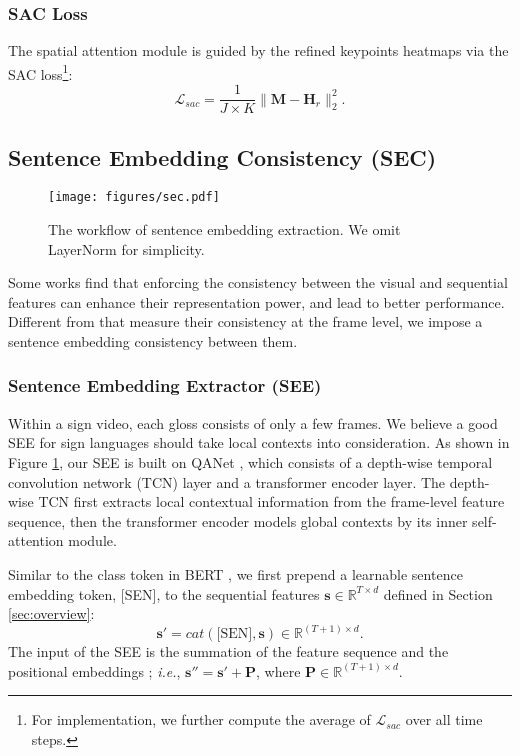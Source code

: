 \documentclass[acmsmall,screen]{acmart}
\def\ie{\emph{i.e.}} \def\Ie{\emph{I.e.}}
\def \mbf{\mathbf}
\begin{document}
\subsubsection{SAC Loss}
The spatial attention module is guided by the refined keypoints heatmaps via the SAC loss\footnote{For implementation, we further compute the average of $\mathcal{L}_{sac}$ over all time steps.}:
\begin{equation}
    \mathcal{L}_{sac} = \frac{1}{J\times K} \| \mbf{M}-\mbf{H}_r \|_2^2.
\end{equation}


\subsection{Sentence Embedding Consistency (SEC)}
\begin{figure}[t]
  \centering
  \texttt{[image: figures/sec.pdf]}
  \caption{The workflow of sentence embedding extraction. We omit LayerNorm \cite{layernorm} for simplicity.}
  \label{fig:sec}
\end{figure}
Some works \cite{vac, self-mutual} find that enforcing the consistency between the visual and sequential features can enhance their representation power, and lead to better performance.
Different from \cite{vac, self-mutual} that measure their consistency at the frame level, we impose a sentence embedding consistency between them.

\subsubsection{Sentence Embedding Extractor (SEE)}
Within a sign video, each gloss consists of only a few frames. 
We believe a good SEE for sign languages should take local contexts into consideration.
As shown in Figure \ref{fig:sec}, our SEE is built on QANet \cite{qanet}, which consists of a depth-wise temporal convolution network (TCN) layer and a transformer encoder layer.
The depth-wise TCN first extracts local contextual information from the frame-level feature sequence, then the transformer encoder models global contexts by its inner self-attention module.

Similar to the class token in BERT \cite{kenton2019bert}, we first prepend a learnable sentence embedding token, [SEN], to the sequential features $\mbf{s}\in\mathbb{R}^{T\times d}$ defined in Section \ref{sec:overview}:
\begin{equation}
    \mbf{s}' = cat(\text{[SEN]}, \mbf{s}) \in \mathbb{R}^{(T+1)\times d}.
\end{equation}
The input of the SEE is the summation of the feature sequence and the positional embeddings \cite{transformer}; \ie, $\mbf{s}''=\mbf{s}' + \mbf{P}$, where $\mbf{P}\in\mathbb{R}^{(T+1)\times d}$.
\end{document}
